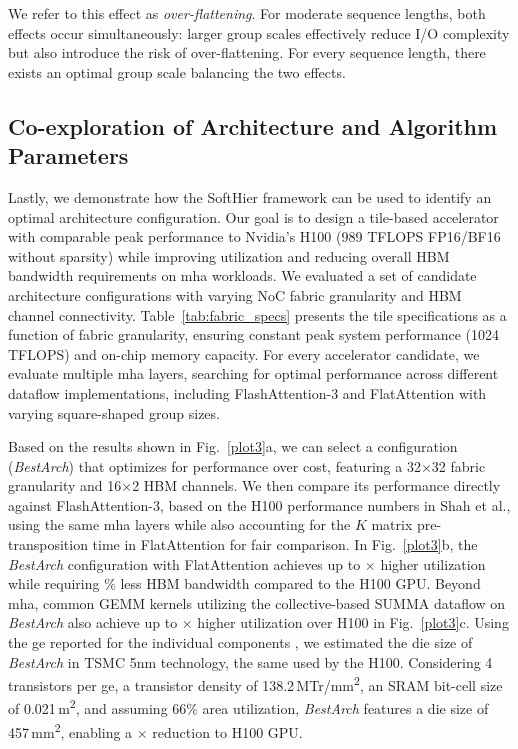 \documentclass[conference]{IEEEtran}
\begin{document}
We refer to this effect as \textit{over-flattening}. For moderate sequence lengths, both effects occur simultaneously: larger group scales effectively reduce I/O complexity but also introduce the risk of over-flattening. For every sequence length, there exists an optimal group scale balancing the two effects.


\subsection{Co-exploration of Architecture and Algorithm Parameters}
\label{subsec:exp3}

Lastly, we demonstrate how the SoftHier framework can be used to identify an optimal \arch architecture configuration. Our goal is to design a tile-based accelerator with comparable peak performance to Nvidia's H100
(989 TFLOPS FP16/BF16 without sparsity)
while improving utilization and reducing overall HBM bandwidth requirements on \gls{mha} workloads. We evaluated a set of candidate architecture configurations with varying NoC fabric granularity and HBM channel connectivity. Table~\ref{tab:fabric_specs} presents the tile specifications as a function of fabric granularity, ensuring constant peak system performance (1024 TFLOPS) and on-chip memory capacity. For every accelerator candidate, we evaluate multiple \gls{mha} layers, searching for optimal performance across different dataflow implementations, including FlashAttention-3 and FlatAttention with varying square-shaped group sizes.

Based on the results shown in Fig.~\ref{plot3}a, we can select a configuration (\textit{BestArch}) that optimizes for performance over cost, featuring a 32×32 fabric granularity and 16×2 HBM channels. We then compare its performance directly against FlashAttention-3, based on the H100 performance numbers in Shah et al.\cite{shah2024}, using the same \gls{mha} layers while also accounting for the $K$ matrix pre-transposition time in FlatAttention for fair comparison.
In Fig.~\ref{plot3}b, the \textit{BestArch} configuration with FlatAttention achieves up to \SUtoNV× higher utilization while requiring \BWreducetoNV\% less HBM bandwidth compared to the H100 GPU.
Beyond \gls{mha}, common GEMM kernels utilizing the collective-based SUMMA dataflow \cite{van1997summa
} on \textit{BestArch} also achieve up to \GEMMSUtoNV× higher utilization over H100 \cite{gemmbench} in Fig.~\ref{plot3}c.
Using the \gls{ge} reported for the individual components \cite{zaruba2020snitch, perotti2025spatz, benz2023high, tortorella2023RedMulE, fischer2025floonoc}, we estimated the die size of \textit{BestArch} in TSMC 5nm technology, the same used by the H100.
Considering 4 transistors per \gls{ge}, a transistor density of 138.2\,MTr/mm\textsuperscript{2}, an SRAM bit-cell size of 0.021\,\textmu m\textsuperscript{2}, and assuming 66\% area utilization, \textit{BestArch} features a die size of 457\,mm\textsuperscript{2}, enabling a \DieSave× reduction to H100 GPU.
\end{document}
